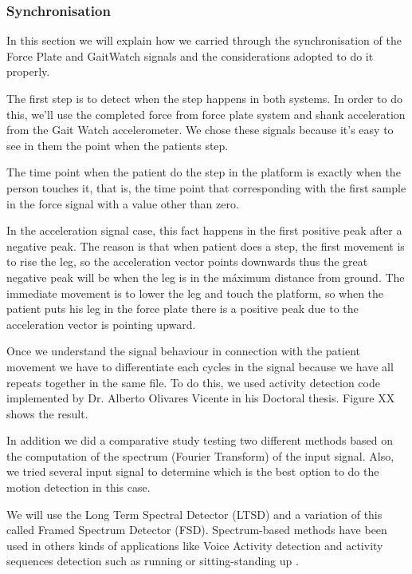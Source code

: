 \subsubsection{Synchronisation}	
In this section we will explain how we carried through the synchronisation of the Force Plate and GaitWatch signals and the considerations adopted to do it properly.

The first step is to detect when the step happens in both systems. In order to do this, we’ll use the completed force from force plate system and shank acceleration from the Gait Watch accelerometer. We chose these signals because it’s easy to see in them the point when the patients step.

The time point when the patient do the step in the platform is exactly when the person touches it, that is, the time point that corresponding with the first sample in the force signal with a value other than zero.

In the acceleration signal case, this fact happens in the first positive peak after a negative peak. The reason is that when patient does a step, the first movement is to rise the leg, so the acceleration vector points downwards thus the great negative peak will be when the leg is in the máximum distance from ground. The immediate movement is to lower the leg and touch the platform, so when the patient puts his leg in the force plate there is a positive peak due to the acceleration vector is pointing upward.

Once we understand the signal behaviour in connection with the patient movement we have to differentiate each cycles in the signal because we have all repeats together in the same file. To do this, we used activity detection code implemented by Dr. Alberto Olivares Vicente in his Doctoral thesis. Figure XX shows the result.

In addition we did a comparative study testing two different methods based on the  computation of the spectrum (Fourier Transform) of the input signal. Also, we tried several input signal to determine which is the best option to do the motion detection in this case.

We will use the Long Term Spectral Detector (LTSD) \cite{Ramirez2004} and a variation of this called Framed Spectrum Detector (FSD). Spectrum-based methods have been used in others kinds of applications like Voice Activity detection \cite{Ramirez2006}\cite{Ramirez2007} and activity sequences detection such as running or sitting-standing up\cite{A.Olivares2013} .

